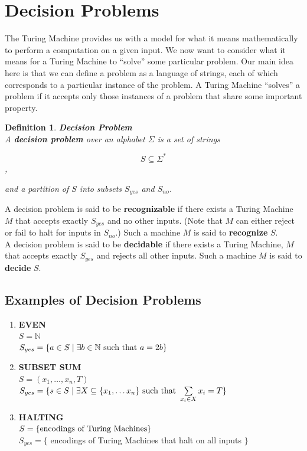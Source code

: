 \documentclass{article}
\newtheorem{definition}{Definition}[section]
\renewcommand{\suchthat}[0]{\textnormal{ such that }}
\begin{document}

\section{Decision Problems}

The Turing Machine provides us with a model for what it means
mathematically to perform a computation on a given input.  We now
want to consider what it means for a Turing Machine to ``solve''
some particular problem.  Our main idea here is that we can define a
problem as a language of strings, each of which corresponds to a
particular instance of the problem.  A Turing Machine ``solves'' a
problem if it accepts only those instances of a problem that share
some important property.

\begin{definition}{\textbf{Decision Problem}}\\
  
  A \textbf{decision problem} over an alphabet $\Sigma$ is a set of
  strings

  $$S \subseteq \Sigma^*$$,

  and a partition of $S$ into subsets $S_{yes}$ and $S_{no}$.\\
\end{definition}

A decision problem is said to be \textbf{recognizable} if there
exists a Turing Machine $M$ that accepts exactly $S_{yes}$ and no
other inputs. (Note that $M$ can either reject or fail to halt for
inputs in $S_{no}$.)  Such a machine $M$ is said to
\textbf{recognize} $S$.
\\

A decision problem is said to be \textbf{decidable} if there exists
a Turing Machine, $M$ that accepts exactly $S_{yes}$ and rejects all
other inputs. Such a machine $M$ is said to \textbf{decide} $S$.

\subsection*{Examples of Decision Problems}

\begin{enumerate}

\item \textbf{EVEN}\\
  $S = \mathbb{N}$\\
  $S_{yes} = \set{a \in S \mid \exists b \in \mathbb{N}$$\suchthat a = 2b}$

\item \textbf{SUBSET SUM}\\
  $S = (x_1, \ldots, x_n, T)$\\
  $S_{yes} = \set{s \in S \mid \exists X \subseteq \set{x_1, \ldots
      x_n} \suchthat \sum\limits_{x_i \in X}x_i = T}$

\item \textbf{HALTING}\\
  $S = \{\textnormal{encodings of Turing Machines}\}$\\
  $S_{yes} = \{$ encodings of Turing Machines that halt on all inputs $\}$
\end{enumerate}
\end{document}
